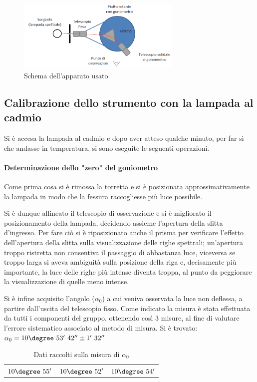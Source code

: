 \documentclass[a4paper,10pt]{article}
\begin{document}
\begin{figure}[H]
	\centering
	\includegraphics[width=0.7\textwidth]{../grafici/Schema1.png}
	\caption{Schema dell'apparato usato}
	\label{fig:schema1}
\end{figure}

\subsection{Calibrazione dello strumento con la lampada al cadmio}

Si è accesa la lampada al cadmio e dopo aver atteso qualche minuto, per far sì che andasse in temperatura, si sono eseguite le seguenti operazioni.

\paragraph{Determinazione dello "zero" del goniometro} Come prima cosa si è rimossa la torretta e si è posizionata approssimativamente la lampada in modo che la fessura raccogliesse più luce possibile. 

Si è dunque allineato il telescopio di osservazione e si è migliorato il posizionamento della lampada, decidendo assieme l'apertura della slitta d'ingresso. Per fare ciò si è riposizionato anche il prisma per verificare l'effetto dell'apertura della slitta sulla visualizzazione delle righe spettrali; un'apertura troppo ristretta non consentiva il passaggio di abbastanza luce, viceversa se troppo larga si aveva ambiguità sulla posizione della riga e, decisamente più importante, la luce delle righe più intense diventa troppa, al punto da peggiorare la visualizzazione di quelle meno intense.

Si è infine acquisito l'angolo ($\alpha_0$) a cui veniva osservata la luce non deflessa, a partire dall'uscita del telescopio fisso. Come indicato la misura è stata effettuata da tutti i componenti del gruppo, ottenendo così 3 misure, al fine di valutare l'errore sistematico associato al metodo di misura.
Si è trovato: $\alpha_0 = 10\degree~53'~42''\pm 1'~32''$
\begin{table}[H]
	\centering
	\begin{tabular}{c|c|c}
		$10\degree~55'$  & $10\degree~52'$ & $10\degree~54'$\\
	\end{tabular}
\caption{Dati raccolti sulla misura di $\alpha_0$}
\end{table}
\end{document}

